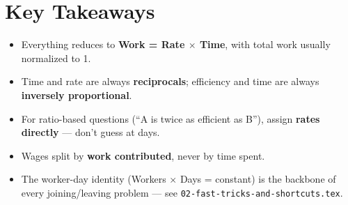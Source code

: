 \documentclass[11pt]{article}
\begin{document}
\section{Key Takeaways}
\begin{itemize}[leftmargin=1.4em]
  \item Everything reduces to \textbf{Work = Rate $\times$ Time}, with total work usually normalized
    to 1.
  \item Time and rate are always \textbf{reciprocals}; efficiency and time are always
    \textbf{inversely proportional}.
  \item For ratio-based questions (``A is twice as efficient as B''), assign \textbf{rates directly}
    --- don't guess at days.
  \item Wages split by \textbf{work contributed}, never by time spent.
  \item The worker-day identity (Workers $\times$ Days = constant) is the backbone of every
    joining/leaving problem --- see \texttt{02-fast-tricks-and-shortcuts.tex}.
\end{itemize}
\end{document}
